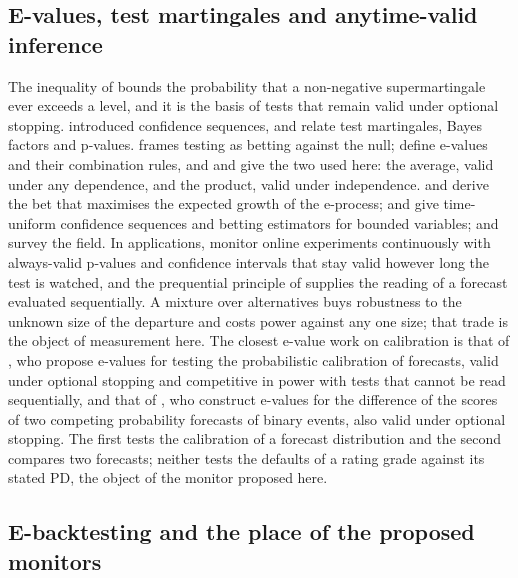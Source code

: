 \subsection{E-values, test martingales and anytime-valid inference}
\label{sec:rw-evalues}

The inequality of \citet{ville1939} bounds the probability that a non-negative supermartingale ever exceeds a level, and it is the basis of tests that remain valid under optional stopping.
\citet{darling1967} introduced confidence sequences, and \citet{shafer2011} relate test martingales, Bayes factors and p-values. \citet{shafer2021}
frames testing as betting against the null; \citet{vovk2021} define e-values and their combination rules, and \citet{vovk2021} and \citet{ramdas2023} give the two used here: the average, valid under any dependence, and the product, valid under independence. \citet{grunwald2024} and \citet{koolen2022} derive the bet that maximises the expected growth of the e-process; \citet{howard2021} and \citet{waudbysmith2024} give
time-uniform confidence sequences and betting estimators for bounded variables; \citet{ramdas2023} and \citet{ramdas2024} survey the field. In applications,
\citet{johari2022} monitor online experiments continuously with always-valid p-values and confidence intervals that stay valid however long the test is watched, and the prequential
principle of \citet{dawid1984} supplies the reading of a forecast evaluated sequentially. A mixture over alternatives buys robustness to the unknown size of the departure and
costs power against any one size; that trade is the object of measurement here. The closest e-value work on calibration is that of \citet{arnold2023}, who propose e-values for testing the probabilistic calibration of forecasts, valid under optional stopping and competitive in power with tests that cannot be read sequentially, and that of \citet{henzi2022}, who construct e-values for the difference of the scores of two competing probability forecasts of binary events, also valid under optional stopping. The first tests the calibration of a forecast distribution and the second compares two forecasts; neither tests the defaults of a rating grade against its stated PD, the object of the monitor proposed here.

\subsection{E-backtesting and the place of the proposed monitors}
\label{sec:rw-ebacktest}

